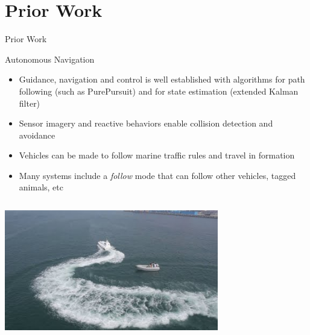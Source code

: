 \documentclass[9pt]{beamer}
\begin{document}
\section{Prior Work}
\begin{frame}{Prior Work}
    \begin{block}{Autonomous Navigation}
	    \begin{itemize}
    	    \item Guidance, navigation and control is well established with algorithms for path following (such as PurePursuit) and for state estimation (extended Kalman filter)
    	    \item Sensor imagery and reactive behaviors enable collision detection and avoidance
    	    \item Vehicles can be made to follow marine traffic rules and travel in formation
    	    \item Many systems include a \textit{follow} mode that can follow other vehicles, tagged animals, etc
        \end{itemize}
    \end{block}
    \begin{columns}
        \begin{column}{0.45\textwidth}
            \begin{block}{}
                \begin{center}
                    \includegraphics[width=0.7\textwidth,trim={5cm 1cm 2cm 1cm},clip]{img/collisionavoidance.jpg}


\end{center}
\end{block}
\end{column}
\end{columns}
\end{frame}
\end{document}
